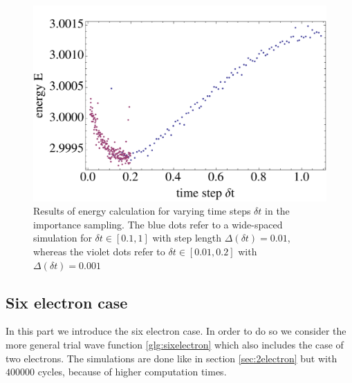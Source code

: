 \begin{figure}[htbp]
    \centering
    \includegraphics[scale=0.6]{importance}
    \caption{Results of energy calculation for varying time steps $\delta t$ in the importance sampling. The blue dots refer to a wide-spaced simulation for $\delta t \in [0.1,1]$ with step length $\Delta (\delta t) = 0.01$, whereas the violet dots refer to $\delta t\in [0.01,0.2]$ with $\Delta(\delta t) = 0.001$}
    \label{fig:importance}
\end{figure}
\FloatBarrier

\subsection{Six electron case}\label{sec:6electron}
In this part we introduce the six electron case. In order to do so we consider the more general trial wave function \ref{glg:sixelectron} which also includes the case of two electrons. The simulations are done like in section \ref{sec:2electron} but with $400000$ cycles, because of higher computation times.

